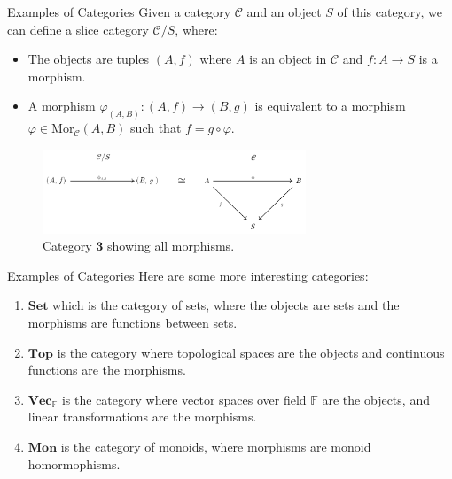 \documentclass[aspectratio=169,xcolor=dvipsnames,10pt]{beamer}
\begin{document}
\begin{frame}[fragile]{Examples of Categories}
        Given a category \(\mathcal{C}\) and an object \(S\) of this category, we can define a slice category \(\mathcal{C} / S\), where:
        \begin{itemize}
            \item The objects are tuples \((A, f)\) where \(A\) is an object in \(\mathcal{C}\) and \(f: A \to S\) is a morphism.
            \item A morphism \(\varphi_{(A, B)} : (A, f) \to (B, g)\) is equivalent to a morphism \(\varphi \in \text{Mor}_{\mathcal{C}}(A, B)\) such that \(f = g \circ \varphi\).
        \end{itemize}
	\begin{figure}[H]
		\begin{center}
			\includegraphics[width=0.70\textwidth]{./figs/SliceCategory.pdf}
		\end{center}
		\caption{Category $\bm 3$ showing all morphisms.}
		\label{fig:3Catcomplete}
	\end{figure}
\end{frame}

\begin{frame}[fragile]{Examples of Categories}
	Here are some more interesting
	categories:
	\begin{enumerate}[1.]
		\item $\mathbf{Set}$ which is the category of sets, where the objects are sets and the morphisms are functions between sets.
		\item $\mathbf{Top}$ is the category where topological spaces are the objects and continuous functions are the morphisms.
		\item $\mathbf{Vec}_\mathbb F$ is the category where vector spaces over field $\mathbb F$ are the objects,
		      and linear transformations are the morphisms.
		\item $\mathbf{Mon}$ is the category of monoids, where morphisms are monoid homormophisms.
	\end{enumerate}
\end{frame}
\end{document}
